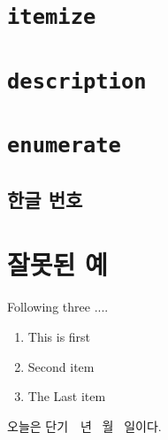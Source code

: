 \documentclass[11pt]{article}
\begin{document}
\tableofcontents

\section{\texttt{itemize}}
\section{\texttt{description}}
\section{\texttt{enumerate}}
\subsection{한글 번호}
\section{잘못된 예}

Following three ....
\begin{enumerate}
\item This is first
\item Second item
\item The Last item
\end{enumerate}

\setcounter{D@anki}{\year}
\addtocounter{D@anki}{2333}
\def\dankitoday{단기~~년 \number\month~월 \number\day~일}

오늘은 \dankitoday 이다.
\end{document}
